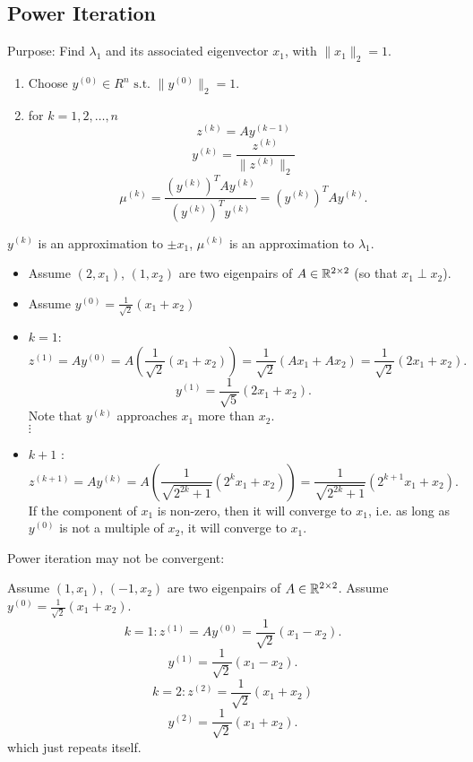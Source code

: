 \documentclass[../main/main.tex]{subfiles}
\begin{document}
\subsection{Power Iteration}
Purpose: Find $\lambda_1$ and its associated eigenvector $x_1$, with $\|x_1\|_2=1$.
\begin{algo}
	\begin{enumerate}
		\item Choose $y^{(0)}\in R^{n}\text{ s.t. }\|y^{(0)}\|_2=1$.
		\item for $k=1,2,\ldots,n$ \[
				z^{(k)}=Ay^{(k-1)}
		\] \[
		y^{(k)}=\frac{z^{(k)}}{\|z^{(k)}\|_2}
		\] \[
		\mu^{(k)}=\frac{\left( y^{(k)} \right)^{T}Ay^{(k)}}{\left( y^{(k)} \right) ^{T}y^{(k)}}=\left( y^{(k)} \right)^{T}Ay^{(k)}.
	\] 
	\end{enumerate}
\end{algo}
	\begin{remark}
		$y^{(k)}$ is an approximation to $\pm x_1$, $\mu^{(k)}$ is an approximation to $\lambda_1$.
	\end{remark}
\begin{itemize}
	\begin{figure}[htpb]
		\centering
		\texttt{[image: 3-27-power-iteration1.png]}
		\caption{}
		\label{fig:}
	\end{figure}
	\item Assume $(2,x_1)$, $(1,x_2)$ are two eigenpairs of $A\in \mathbb{R}^{2\times 2}$ (so that $x_1\perp x_2$). 
	\item Assume $y^{(0)}=\frac{1}{\sqrt{2} }\left( x_1+x_2 \right) $
	\item $k=1$:
		\[
			z^{(1)}=Ay^{(0)}=A\left( \frac{1}{\sqrt{2} }(x_1+x_2) \right) =\frac{1}{\sqrt{2} }(Ax_1+Ax_2)=\frac{1}{\sqrt{2} }(2x_1+x_2)
		.\] \[
		y^{(1)}=\frac{1}{\sqrt{5} }(2x_1+x_2) 
		.\] Note that $y^{(k)}$ approaches $x_1$ more than $x_2$.\\
		$\vdots$
	\item $k+1$ :
		\[
			z^{(k+1)}=Ay^{(k)}=A\left( \frac{1}{\sqrt{2^{2k}+1}}\left( 2^{k}x_1+x_2 \right)  \right)=\frac{1}{\sqrt{2^{2k}+1}}\left( 2^{k+1}x_1+x_2 \right) 
.\] If the component of $x_1$ is non-zero, then it will converge to $x_1$, i.e. as long as $y^{(0)}$ is not a multiple of $x_2$, it will converge to $x_1$.
\end{itemize}
\begin{claim}
	Power iteration may not be convergent:
\end{claim}
\begin{example}
	Assume $(1,x_1)$, $(-1,x_2)$ are two eigenpairs of $A\in \mathbb{R}^{2\times 2}$. Assume $y^{(0)}=\frac{1}{\sqrt{2} }\left( x_1+x_2 \right) $. 
	 \[
		 k=1: z^{(1)}=Ay^{(0)}=\frac{1}{\sqrt{2} }\left( x_1-x_2 \right) 
	.\] \[
	y^{(1)}=\frac{1}{\sqrt{2} }(x_1-x_2)
	.\] \[
	k=2:z^{(2)}=\frac{1}{\sqrt{2} }\left( x_1+x_2 \right) 
	\]\[y^{(2)}=\frac{1}{\sqrt{2} }\left( x_1+x_2 \right) 
	.\] which just repeats itself.
\end{example}
\end{document}

